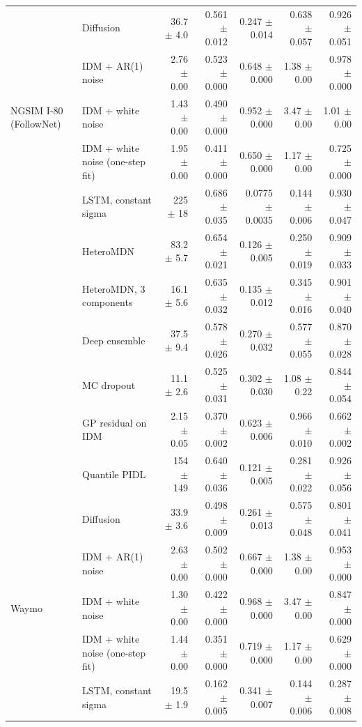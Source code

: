 \begin{longtable}{llrrrrr}
 & Diffusion & 36.7 $\pm$ 4.0 & 0.561 $\pm$ 0.012 & 0.247 $\pm$ 0.014 & 0.638 $\pm$ 0.057 & 0.926 $\pm$ 0.051 \\
 & IDM + AR(1) noise & 2.76 $\pm$ 0.00 & 0.523 $\pm$ 0.000 & 0.648 $\pm$ 0.000 & 1.38 $\pm$ 0.00 & 0.978 $\pm$ 0.000 \\
\midrule
NGSIM I-80 (FollowNet) & IDM + white noise & 1.43 $\pm$ 0.00 & 0.490 $\pm$ 0.000 & 0.952 $\pm$ 0.000 & 3.47 $\pm$ 0.00 & 1.01 $\pm$ 0.00 \\
 & IDM + white noise (one-step fit) & 1.95 $\pm$ 0.00 & 0.411 $\pm$ 0.000 & 0.650 $\pm$ 0.000 & 1.17 $\pm$ 0.00 & 0.725 $\pm$ 0.000 \\
 & LSTM, constant sigma & 225 $\pm$ 18 & 0.686 $\pm$ 0.035 & 0.0775 $\pm$ 0.0035 & 0.144 $\pm$ 0.006 & 0.930 $\pm$ 0.047 \\
 & HeteroMDN & 83.2 $\pm$ 5.7 & 0.654 $\pm$ 0.021 & 0.126 $\pm$ 0.005 & 0.250 $\pm$ 0.019 & 0.909 $\pm$ 0.033 \\
 & HeteroMDN, 3 components & 16.1 $\pm$ 5.6 & 0.635 $\pm$ 0.032 & 0.135 $\pm$ 0.012 & 0.345 $\pm$ 0.016 & 0.901 $\pm$ 0.040 \\
 & Deep ensemble & 37.5 $\pm$ 9.4 & 0.578 $\pm$ 0.026 & 0.270 $\pm$ 0.032 & 0.577 $\pm$ 0.055 & 0.870 $\pm$ 0.028 \\
 & MC dropout & 11.1 $\pm$ 2.6 & 0.525 $\pm$ 0.031 & 0.302 $\pm$ 0.030 & 1.08 $\pm$ 0.22 & 0.844 $\pm$ 0.054 \\
 & GP residual on IDM & 2.15 $\pm$ 0.05 & 0.370 $\pm$ 0.002 & 0.623 $\pm$ 0.006 & 0.966 $\pm$ 0.010 & 0.662 $\pm$ 0.002 \\
 & Quantile PIDL & 154 $\pm$ 149 & 0.640 $\pm$ 0.036 & 0.121 $\pm$ 0.005 & 0.281 $\pm$ 0.022 & 0.926 $\pm$ 0.056 \\
 & Diffusion & 33.9 $\pm$ 3.6 & 0.498 $\pm$ 0.009 & 0.261 $\pm$ 0.013 & 0.575 $\pm$ 0.048 & 0.801 $\pm$ 0.041 \\
 & IDM + AR(1) noise & 2.63 $\pm$ 0.00 & 0.502 $\pm$ 0.000 & 0.667 $\pm$ 0.000 & 1.38 $\pm$ 0.00 & 0.953 $\pm$ 0.000 \\
\midrule
Waymo & IDM + white noise & 1.30 $\pm$ 0.00 & 0.422 $\pm$ 0.000 & 0.968 $\pm$ 0.000 & 3.47 $\pm$ 0.00 & 0.847 $\pm$ 0.000 \\
 & IDM + white noise (one-step fit) & 1.44 $\pm$ 0.00 & 0.351 $\pm$ 0.000 & 0.719 $\pm$ 0.000 & 1.17 $\pm$ 0.00 & 0.629 $\pm$ 0.000 \\
 & LSTM, constant sigma & 19.5 $\pm$ 1.9 & 0.162 $\pm$ 0.005 & 0.341 $\pm$ 0.007 & 0.144 $\pm$ 0.006 & 0.287 $\pm$ 0.008 \\

\end{longtable}
